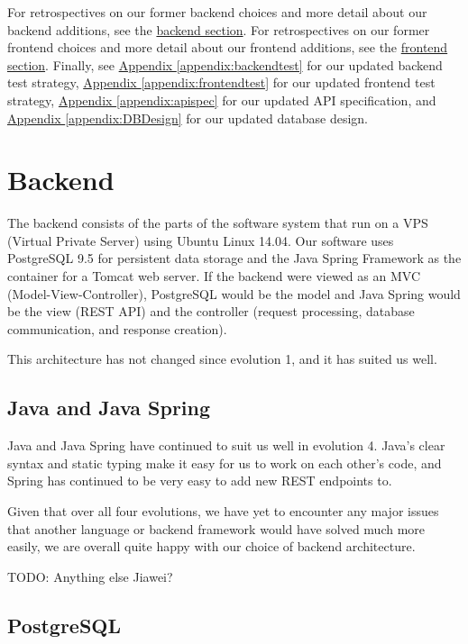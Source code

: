 \documentclass[12pt]{article}
\begin{document}
For retrospectives on our former backend choices and more detail about our backend additions, see the \hyperref[sec:Backend]{backend section}. For retrospectives on our former frontend choices and more detail about our frontend additions, see the \hyperref[sec:Frontend]{frontend section}. Finally, see \hyperref[appendix:backendtest]{Appendix \ref{appendix:backendtest}} for our updated backend test strategy,  \hyperref[appendix:frontendtest]{Appendix \ref{appendix:frontendtest}} for our updated frontend test strategy, \hyperref[appendix:apispec]{Appendix \ref{appendix:apispec}} for our updated API specification, and \hyperref[appendix:DBDesign]{Appendix \ref{appendix:DBDesign}} for our updated database design. 

\section{Backend}

\label{sec:Backend}
The backend consists of the parts of the software system that run on a VPS (Virtual Private Server) using Ubuntu Linux 14.04. Our software uses PostgreSQL 9.5 for persistent data storage and the Java Spring Framework as the container for a Tomcat web server. If the backend were viewed as an MVC (Model-View-Controller), PostgreSQL would be the model and Java Spring would be the view (REST API) and the controller (request processing, database communication, and response creation). 

This architecture has not changed since evolution 1, and it has suited us well. 

\subsection{Java and Java Spring}
Java and Java Spring have continued to suit us well in evolution 4. Java's clear syntax and static typing make it easy for us to work on each other's code, and Spring has continued to be very easy to add new REST endpoints to. 

Given that over all four evolutions, we have yet to encounter any major issues that another language or backend framework would have solved much more easily, we are overall quite happy with our choice of backend architecture. 

TODO: Anything else Jiawei?



\subsection{PostgreSQL}
\end{document}

